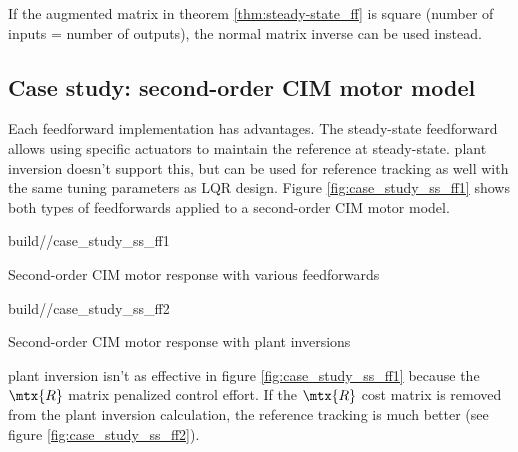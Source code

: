If the augmented matrix in theorem \ref{thm:steady-state_ff} is square (number
of \glspl{input} = number of \glspl{output}), the normal matrix inverse can be
used instead.

\subsection{Case study: second-order CIM motor model}

Each feedforward implementation has advantages. The steady-state feedforward
allows using specific actuators to maintain the \gls{reference} at steady-state.
\Gls{plant} inversion doesn't support this, but can be used for \gls{reference}
\gls{tracking} as well with the same tuning parameters as LQR design. Figure
\ref{fig:case_study_ss_ff1} shows both types of feedforwards applied to a
second-order CIM motor model.

\begin{bookfigure}
  \begin{minisvg}{2}{build/\partpath/case_study_ss_ff1}
    \caption{Second-order CIM motor response with various feedforwards}
    \label{fig:case_study_ss_ff1}
  \end{minisvg}
  \hfill
  \begin{minisvg}{2}{build/\partpath/case_study_ss_ff2}
    \caption{Second-order CIM motor response with plant inversions}
    \label{fig:case_study_ss_ff2}
  \end{minisvg}
\end{bookfigure}

\Gls{plant} inversion isn't as effective in figure \ref{fig:case_study_ss_ff1}
because the $\mtx{R}$ matrix penalized \gls{control effort}. If the $\mtx{R}$
cost matrix is removed from the \gls{plant} inversion calculation, the
\gls{reference} \gls{tracking} is much better (see figure
\ref{fig:case_study_ss_ff2}).
